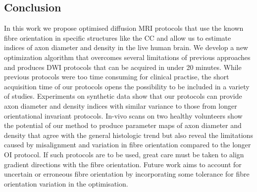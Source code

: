 \subsection*{Conclusion}
In this work we propose optimised diffusion MRI protocols that use the known fibre orientation in specific structures like the CC and allow us to estimate indices of axon diameter and density in the live human brain. We develop a new optimization algorithm that overcomes several limitations of previous approaches and produces DWI protocols that can be acquired in under 20 minutes. While previous protocols were too time consuming for clinical practise, the short acquisition time of our protocols opens the possibility to be included in a variety of studies. Experiments on synthetic data show that our protocols can provide axon diameter and density indices with similar variance to those from longer orientational invariant protocols. In-vivo scans on two healthy volunteers show the potential of our method to produce parameter maps of axon diameter and density that agree with the general histologic trend but also reveal the limitations caused by misalignment and variation in fibre orientation compared to the longer OI protocol. If such protocols are to be used, great care must be taken to align gradient directions with the fibre orientation. Future work aims to account for uncertain or erroneous fibre orientation by incorporating some tolerance for fibre orientation variation in the optimisation.
